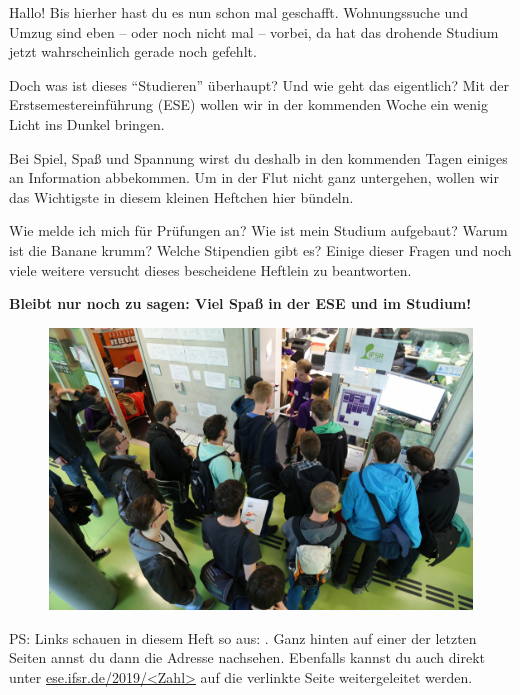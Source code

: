 

Hallo! Bis hierher hast du es nun schon mal geschafft. Wohnungssuche und Umzug sind eben -- oder noch nicht mal -- vorbei, da hat das drohende Studium jetzt wahrscheinlich gerade noch gefehlt.

Doch was ist dieses \enquote{Studieren} überhaupt? Und wie geht das eigentlich? Mit der Erstsemestereinführung (ESE) wollen wir in der kommenden Woche ein wenig Licht ins Dunkel bringen.



Bei Spiel, Spaß und Spannung wirst du deshalb in den kommenden Tagen einiges an Information abbekommen. Um in der Flut nicht ganz untergehen, wollen wir das Wichtigste in diesem kleinen Heftchen hier bündeln.

Wie melde ich mich für Prüfungen an?  Wie ist mein Studium aufgebaut? Warum ist die Banane krumm? Welche Stipendien gibt es?
Einige dieser Fragen und noch viele weitere versucht dieses bescheidene Heftlein zu beantworten. %

\textbf{Bleibt nur noch zu sagen: Viel Spaß in der ESE und im Studium!}

\begin{figure}[b!]
	\centering
	\includegraphics[trim={0 5.5cm 0 0}, clip, width=\linewidth]{img/ese2015/bueroansturm.jpg}
\end{figure}%

\bigskip
{\small PS\@: Links schauen in diesem Heft so aus: . Ganz hinten auf einer der letzten Seiten annst du dann die Adresse nachsehen. Ebenfalls kannst du auch direkt unter \url{ese.ifsr.de/2019/<Zahl>} auf die verlinkte Seite weitergeleitet werden.}
